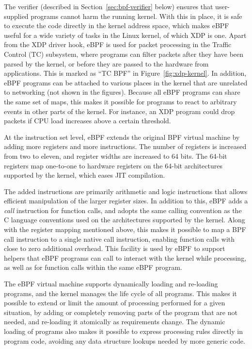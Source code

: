 \documentclass[sigconf]{acmart}
\begin{document}
The verifier (described in Section~\ref{sec:bpf-verifier} below) ensures that
user-supplied programs cannot harm the running kernel. With this in place, it is
safe to execute the code directly in the kernel address space, which makes eBPF
useful for a wide variety of tasks in the Linux kernel, of which XDP is one.
Apart from the XDP driver hook, eBPF is used for packet processing in the
Traffic Control (TC) subsystem, where programs can filter packets after they
have been parsed by the kernel, or before they are passed to the hardware from
applications. This is marked as ``TC BPF'' in Figure~\ref{fig:xdp-kernel}. In
addition, eBPF programs can be attached to various places in the kernel that are
unrelated to networking (not shown in the figures). Because all eBPF programs
can share the same set of maps, this makes it possible for programs to react to
arbitrary events in other parts of the kernel. For instance, an XDP program
could drop packets if CPU load increases above a certain threshold.

At the instruction set level, eBPF extends the original BPF virtual machine by
adding more registers and more instructions. The number of registers is
increased from two to eleven, and register widths are increased to 64 bits. The
64-bit registers map one-to-one to hardware registers on the 64-bit
architectures supported by the kernel, which eases JIT compilation.

The added instructions are primarily arithmetic and logic instructions that
allows efficient manipulation of the larger register sizes. In addition to this,
eBPF adds a \emph{call} instruction for function calls, and adopts the same
calling convention as the C language conventions used on the architectures
supported by the kernel. Along with the register mapping mentioned above, this
makes it possible to map a BPF call instruction to a single native call
instruction, enabling function calls with close to zero additional overhead.
This facility is used by eBPF to support helpers that eBPF programs can call to
interact with the kernel while processing, as well as for function calls within
the same eBPF program.

The eBPF virtual machine supports dynamically loading and re-loading programs,
and the kernel manages the life cycle of all programs. This makes it possible to
extend or limit the amount of processing performed for a given situation, by
adding or completely removing parts of the program that are not needed, and
re-loading it atomically as requirements change. The dynamic loading of programs
also makes it possible to express processing rules directly in program code,
avoiding any data structure lookups needed by more generic code.
\end{document}
